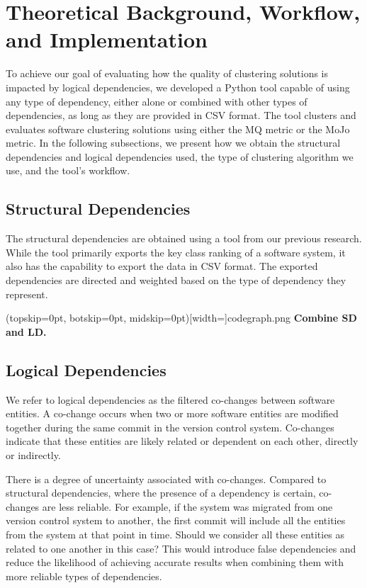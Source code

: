\documentclass{ieeeaccess}
\begin{document}
\section{Theoretical Background, Workflow, and Implementation}
\label{sec:workflow_implementation}

To achieve our goal of evaluating how the quality of clustering solutions is impacted by logical dependencies, we developed a Python tool capable of using any type of dependency, either alone or combined with other types of dependencies, as long as they are provided in CSV format. The tool clusters and evaluates software clustering solutions using either the MQ metric or the MoJo metric. In the following subsections, we present how we obtain the structural dependencies and logical dependencies used, the type of clustering algorithm we use, and the tool's workflow.

\subsection{Structural Dependencies}
\label{subsec:sd}

The structural dependencies are obtained using a tool from our previous research. While the tool primarily exports the key class ranking of a software system, it also has the capability to export the data in CSV format. The exported dependencies are directed and weighted based on the type of dependency they represent.

\Figure[t!](topskip=0pt, botskip=0pt, midskip=0pt)[width=\textwidth]{codegraph.png}
{ \textbf{Combine SD and LD.}\label{fig:codegraph}}

\subsection{Logical Dependencies}
\label{subsec:ld}

We refer to logical dependencies as the filtered co-changes between software entities. A co-change occurs when two or more software entities are modified together during the same commit in the version control system. Co-changes indicate that these entities are likely related or dependent on each other, directly or indirectly.

There is a degree of uncertainty associated with co-changes. Compared to structural dependencies, where the presence of a dependency is certain, co-changes are less reliable. For example, if the system was migrated from one version control system to another, the first commit will include all the entities from the system at that point in time. Should we consider all these entities as related to one another in this case? This would introduce false dependencies and reduce the likelihood of achieving accurate results when combining them with more reliable types of dependencies.
\end{document}
